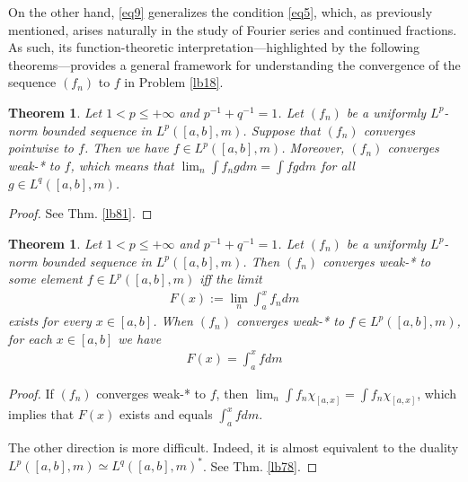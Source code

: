 \documentclass[12pt,b5paper,notitlepage]{article}
\theoremstyle{definition}
\theoremstyle{plain}
\newtheorem{thm}[df]{Theorem}
\newcommand{\eps}{\varepsilon}
\numberwithin{equation}{section}
\begin{document}
On the other hand, \eqref{eq9} generalizes the condition \eqref{eq5}, which, as previously mentioned, arises naturally in the study of Fourier series and continued fractions. As such, its function-theoretic interpretation---highlighted by the following theorems---provides a general framework for understanding the convergence of the sequence $(f_n)$ to $f$ in Problem \ref{lb18}. 


\begin{thm}
Let $1<p\leq+\infty$ and $p^{-1}+q^{-1}=1$. Let $(f_n)$ be a uniformly $L^p$-norm bounded sequence in $L^p([a,b],m)$. Suppose that $(f_n)$ converges pointwise to $f$. Then we have $f\in L^p([a,b],m)$. Moreover,  $(f_n)$ converges weak-* to $f$, which means that $\lim_n\int f_ngdm=\int fgdm$ for all $g\in L^q([a,b],m)$.
\end{thm}

\begin{proof}
See Thm. \ref{lb81}.
\end{proof}


\begin{thm}\label{lb20}
Let $1<p\leq+\infty$ and $p^{-1}+q^{-1}=1$. Let $(f_n)$ be a uniformly $L^p$-norm bounded sequence in $L^p([a,b],m)$. Then $(f_n)$ converges weak-* to some element $f\in L^p([a,b],m)$  iff the limit
\begin{align}\label{eq14}
F(x):=\lim_n \int_a^x f_ndm
\end{align}
exists for every $x\in[a,b]$. When $(f_n)$ converges weak-* to $f\in L^p([a,b],m)$, for each $x\in[a,b]$ we have
\begin{align}\label{eq12}
F(x)=\int_a^x fdm
\end{align}
\end{thm}

\begin{proof}
If $(f_n)$ converges weak-* to $f$, then $\lim_n \int f_n\chi_{[a,x]}=\int f_n\chi_{[a,x]}$, which implies that $F(x)$ exists and equals $\int_a^x fdm$. 

The other direction is more difficult. Indeed, it is almost equivalent to the duality $L^p([a,b],m)\simeq L^q([a,b],m)^*$. See Thm. \ref{lb78}.
\end{proof}

\begin{comment}

Conversely, assume that $F(x)$ exists for all $x$. Let $M=\sup_n\Vert f_n\Vert_p$, which by assumption is finite. For each $\eps>0$ and for each mutually disjoint intervals $I_1=(a_1,b_1),\dots,I_k=(a_k,b_k)$ in $[a,b]$ with total length $\leq M^{-q}\eps^q$, setting $I=I_1\cup\cdots\cup I_k$, we have
\begin{align*}
\sum_{i=1}^k |F(b_i)-F(a_i)|\leq\sum_{i=1}^k \limsup_n\int_{I_i} |f_n|dm\leq M\Vert\chi_I\Vert_q=M\cdot m(I)^{\frac 1q}\leq \eps
\end{align*}
Therefore $F$ is absolutely continuous. Thus, $f:=F'$ exists a.e. and is $L^1$, and \eqref{eq12} holds for all $f$.
\end{comment}
\end{document}
